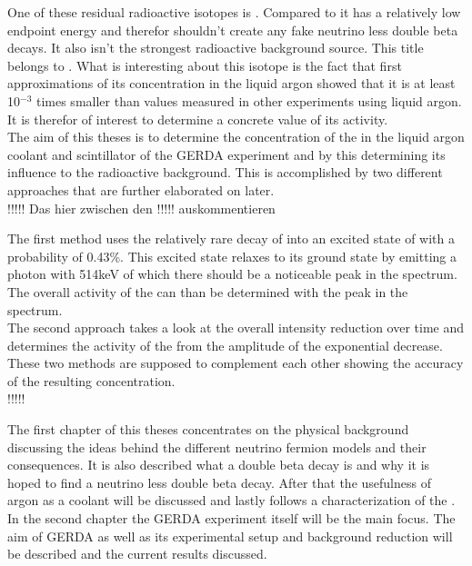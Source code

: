 One of these residual radioactive isotopes is \Kr. 
Compared to  it has a relatively low endpoint energy and therefor shouldn't create any fake neutrino less double beta decays. 
It also isn't the strongest radioactive background source. 
This title belongs to . 
What is interesting about this isotope is the fact that first approximations of its concentration in the liquid argon showed that it is at least 10\(^{-3}\) times smaller than values measured in other experiments using liquid argon.
It is therefor of interest to determine a concrete value of its activity. %
\\

The aim of this theses is to determine the concentration of the \Kr in the liquid argon coolant and scintillator of the GERDA experiment and by this determining its influence to the radioactive background. 
This is accomplished by two different approaches that are further elaborated on later. \\

!!!!! Das hier zwischen den !!!!! auskommentieren

The first method uses the relatively rare decay of \Kr into an excited state of  with a probability of 0.43\%. 
This excited state relaxes to its ground state by emitting a photon with 514keV of which there should be a noticeable peak in the spectrum. 
The overall activity of the \Kr can than be determined with the peak in the spectrum. 
\\

The second approach takes a look at the overall intensity reduction over time and determines the activity of the \Kr from the amplitude of the exponential decrease. 
These two methods are supposed to complement each other showing the accuracy of the resulting concentration.\\

!!!!!

The first chapter of this theses concentrates on the physical background discussing the ideas behind the different neutrino fermion models and their consequences. 
It is also described what a double beta decay is and why it is hoped to find a neutrino less double beta decay. 
After that the usefulness of argon as a coolant will be discussed and lastly follows a characterization of the \Kr.\\

In the second chapter the GERDA experiment itself will be the main focus. 
The aim of GERDA as well as its experimental setup and background reduction will be described and the current results discussed.\\

